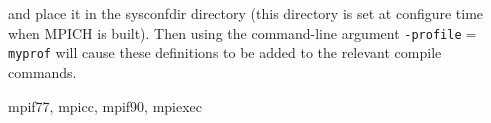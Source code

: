 and place it in the sysconfdir directory (this directory is set at
configure time when MPICH is built).  Then using the command-line
argument {\tt -profile$=$myprof} will cause these
definitions to be added to the relevant compile commands.
\par
{}
 mpif77, mpicc, mpif90, mpiexec
\nextline
{}
\endmanpage
